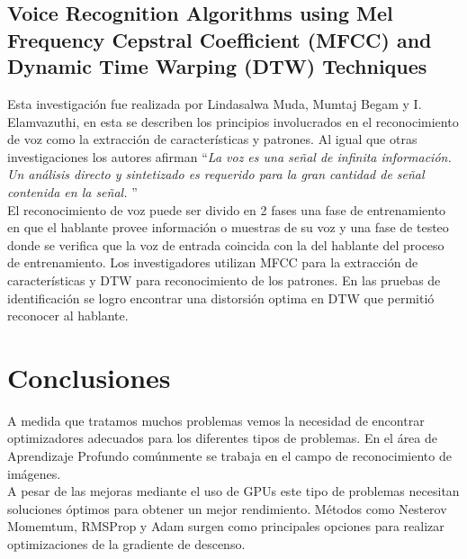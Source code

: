 \subsection{Voice Recognition Algorithms using Mel Frequency Cepstral Coefficient (MFCC) and Dynamic Time Warping (DTW) Techniques
}
Esta investigación fue realizada por Lindasalwa Muda, Mumtaj Begam y I. Elamvazuthi, en esta se describen los principios involucrados en el reconocimiento de voz como la extracción de características y patrones. Al igual que otras investigaciones los autores afirman \textquotedblleft \textit{La voz es una señal de infinita información. Un análisis directo y sintetizado es requerido para la gran cantidad de señal contenida en la señal.} \textquotedblright \\ El reconocimiento de voz puede ser divido en 2 fases una fase de entrenamiento en que el hablante provee información o muestras de su voz y una fase de testeo donde se verifica que la voz de entrada coincida con la del hablante del proceso de entrenamiento.	Los investigadores utilizan MFCC para la extracción de características y DTW para reconocimiento de los patrones. En las pruebas de identificación se logro encontrar una distorsión optima en DTW que permitió reconocer al hablante.

\section{Conclusiones}
A medida que tratamos muchos problemas vemos la necesidad de encontrar optimizadores adecuados para los diferentes tipos de problemas. En el área de Aprendizaje Profundo comúnmente se trabaja en el campo de reconocimiento de imágenes.\\ A pesar de las mejoras mediante el uso de GPUs este tipo de problemas necesitan soluciones óptimos para obtener un mejor rendimiento. Métodos como Nesterov Momemtum, RMSProp y Adam surgen como principales opciones para realizar optimizaciones de la gradiente de descenso.

